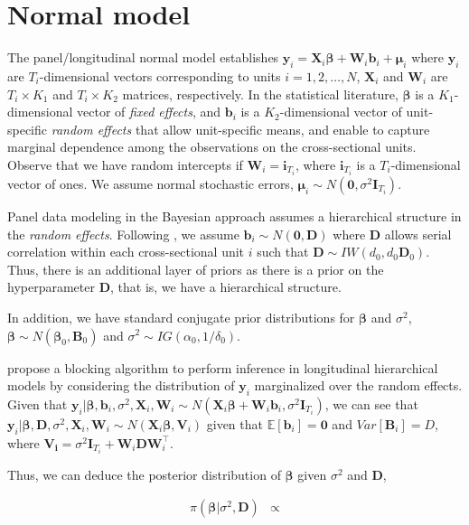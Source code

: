 \section{Normal model}\label{sec91}

The panel/longitudinal normal model establishes $\bm{y}_i=\bm{X}_i\bm{\beta}+\bm{W}_i\bm{b}_i+\bm{\mu}_i$ where $\bm{y}_i$ are $T_i$-dimensional vectors corresponding to units $i=1,2,\dots,N$, $\bm{X}_i$ and $\bm{W}_i$ are $T_i\times K_1$ and $T_i\times K_2$ matrices, respectively. In the statistical literature, $\bm{\beta}$ is a $K_1$-dimensional vector of \textit{fixed effects}, and $\bm{b}_i$ is a $K_2$-dimensional vector of unit-specific \textit{random effects} that allow unit-specific means, and enable to capture marginal dependence among the observations on the cross-sectional units. Observe that we have random intercepts if $\bm{W}_i=\bm{i}_{T_i}$, where $\bm{i}_{T_i}$ is a $T_i$-dimensional vector of ones. We assume normal stochastic errors, $\bm{\mu}_i\sim{N}(\bm{0},\sigma^2\bm{I}_{T_i})$.

Panel data modeling in the Bayesian approach assumes a hierarchical structure in the \textit{random effects}. Following \cite{Chib1999}, we assume $\bm{b}_i\sim{N}(\bm{0},\bm{D})$ where $\bm{D}$ allows serial correlation within each cross-sectional unit $i$ such that $\bm{D}\sim{I}{W}(d_0,d_0\bm{D}_0)$. Thus, there is an additional layer of priors as there is a prior on the hyperparameter $\bm{D}$, that is, we have a hierarchical structure. 

In addition, we have standard conjugate prior distributions for $\bm{\beta}$ and $\sigma^2$, $\bm{\beta} \sim {N}(\bm{\beta}_0,\bm{B}_0)$ and 
$\sigma^2 \sim {I}{G}(\alpha_0, 1/\delta_0)$. 

\cite{Chib1999} propose a blocking algorithm to perform inference in longitudinal hierarchical models by considering the distribution of $\bm{y}_i$ marginalized over the random effects. Given that $\bm{y}_i| \bm{\beta},\bm{b}_i,\sigma^2,\bm{X}_i,\bm{W}_i\sim N(\bm{X}_i\bm{\beta}+\bm{W}_i\bm{b}_i,\sigma^2\bm{I}_{T_i})$, we can see that    $\bm{y}_i|\bm{\beta},\bm{D},\sigma^2,\bm{X}_i,\bm{W}_i\sim{N}(\bm{X}_i\bm{\beta},\bm{V}_i)$ given that $\mathbb{E}[\bm{b}_i]=\bm{0}$ and $Var[\bm{B}_i]=D$, where $\bm{V_i}=\sigma^2\bm{I}_{T_i}+\bm{W}_i\bm{D}\bm{W}_i^{\top}$.

Thus, we can deduce the posterior distribution of $\bm{\beta}$ given $\sigma^2$ and $\bm{D}$,

\begin{align*}
	\pi(\bm{\beta}|\sigma^2, \bm{D}) & \propto 
\end{align*} 

